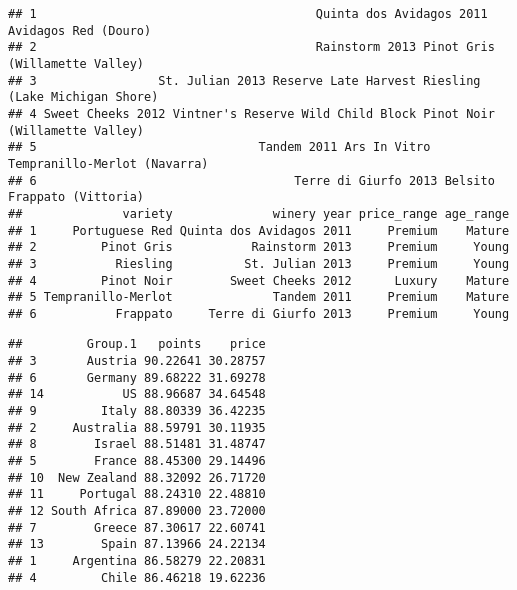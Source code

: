 \documentclass[
]{article}
\newenvironment{Shaded}{\begin{snugshade}}{\end{snugshade}}
\newcommand{\DataTypeTok}[1]{\textcolor[rgb]{0.13,0.29,0.53}{#1}}
\newcommand{\DecValTok}[1]{\textcolor[rgb]{0.00,0.00,0.81}{#1}}
\newcommand{\KeywordTok}[1]{\textcolor[rgb]{0.13,0.29,0.53}{\textbf{#1}}}
\newcommand{\NormalTok}[1]{#1}
\newcommand{\OperatorTok}[1]{\textcolor[rgb]{0.81,0.36,0.00}{\textbf{#1}}}
\newcommand{\OtherTok}[1]{\textcolor[rgb]{0.56,0.35,0.01}{#1}}
\newcommand{\StringTok}[1]{\textcolor[rgb]{0.31,0.60,0.02}{#1}}
\begin{document}
\begin{verbatim}
## 1                                       Quinta dos Avidagos 2011 Avidagos Red (Douro)
## 2                                       Rainstorm 2013 Pinot Gris (Willamette Valley)
## 3                 St. Julian 2013 Reserve Late Harvest Riesling (Lake Michigan Shore)
## 4 Sweet Cheeks 2012 Vintner's Reserve Wild Child Block Pinot Noir (Willamette Valley)
## 5                               Tandem 2011 Ars In Vitro Tempranillo-Merlot (Navarra)
## 6                                    Terre di Giurfo 2013 Belsito Frappato (Vittoria)
##              variety              winery year price_range age_range
## 1     Portuguese Red Quinta dos Avidagos 2011     Premium    Mature
## 2         Pinot Gris           Rainstorm 2013     Premium     Young
## 3           Riesling          St. Julian 2013     Premium     Young
## 4         Pinot Noir        Sweet Cheeks 2012      Luxury    Mature
## 5 Tempranillo-Merlot              Tandem 2011     Premium    Mature
## 6           Frappato     Terre di Giurfo 2013     Premium     Young
\end{verbatim}

\begin{Shaded}
\end{Shaded}

\begin{verbatim}
##         Group.1   points    price
## 3       Austria 90.22641 30.28757
## 6       Germany 89.68222 31.69278
## 14           US 88.96687 34.64548
## 9         Italy 88.80339 36.42235
## 2     Australia 88.59791 30.11935
## 8        Israel 88.51481 31.48747
## 5        France 88.45300 29.14496
## 10  New Zealand 88.32092 26.71720
## 11     Portugal 88.24310 22.48810
## 12 South Africa 87.89000 23.72000
## 7        Greece 87.30617 22.60741
## 13        Spain 87.13966 24.22134
## 1     Argentina 86.58279 22.20831
## 4         Chile 86.46218 19.62236
\end{verbatim}

\begin{Shaded}
\end{Shaded}
\end{document}
